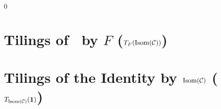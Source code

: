 \newcommand\includetiling[2]{%
  \edef\myfile{#1/#2.png}%
  \edef\myincludegraphic{\noexpand\texttt{[image: \\myfile]}}
  \myincludegraphic
}

\newcommand\includenexttiling[2]{%
  \edef\nextnum{\the\numexpr #2-1\relax}%
  \edef\includenextnexttiling{\noexpand\includenexttiling{#1}{\nextnum}}%
  \ifnum #2=0 \else \includenextnexttiling\includetiling{#1}{#2} \fi%
}

\newcommand\includealltilings[1]{%
  \includenexttiling{#1}{48}%
}

\setcounter{section}0
\section{Tilings of \IsomC\ by $F$ ($T_F(\operatorname{Isom}(\mathcal C))$)}
  \label{sec:tilings-T_F(C)}

\newpage
\section{Tilings of the Identity by $\operatorname{Isom}(\mathcal C)$ ($T_{\operatorname{Isom}(\mathcal C)}(\mathbf{1})$)}
  \label{sec:tilings-T_C(I)}
